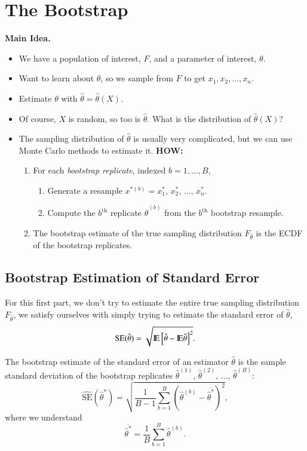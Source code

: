 \documentclass[captions=tableheading]{scrbook}
\begin{document}
\section{The Bootstrap}
\label{sec-4_2}



\textbf{Main Idea.}

\begin{itemize}
\item We have a population of interest, $F$, and a parameter of interest, $\theta$.
\item Want to learn about $\theta$, so we sample from $F$ to get \(x_{1}, x_{2}, ..., x_{n}\).
\item Estimate $\theta$ with $\hat{\theta} = \hat{\theta}(X)$.
\item Of course, $X$ is random, so too is $\hat{\theta}$.  What is the distribution of $\hat{\theta}(X)$?
\item The sampling distribution of $\hat{\theta}$ is usually very complicated, but we can use Monte Carlo methods to estimate it.  \textbf{HOW:}
\begin{enumerate}
\item For each \emph{bootstrap replicate}, indexed \(b = 1, \ldots, B\),
\begin{enumerate}
\item Generate a resample $x^{\ast(b)}= x_{1}^{\ast},\,x_{2}^{\ast},\,\ldots,\,x_{n}^{\ast}$.
\item Compute the $b^{\mathrm{th}}$ replicate $\hat{\theta}^{(b)}$ from the $b^{\mathrm{th}}$ bootstrap resample.
\end{enumerate}
\item The bootstrap estimate of the true sampling distribution $F_{\hat{\theta}}$ is the ECDF of the bootstrap replicates.
\end{enumerate}
\end{itemize}
\subsection{Bootstrap Estimation of Standard Error}
\label{sec-4_2_1}


For this first part, we don't try to estimate the entire true sampling distribution $F_{\hat{\theta}}$, we satisfy ourselves with simply trying to estimate the standard error of $\hat{\theta}$,
\[
\mathrm{SE}(\hat{\theta})=\sqrt{ \mathrm{I\hspace{-1.5pt}E} \left[\hat{\theta} - \mathrm{I\hspace{-1.5pt}E}\hat{\theta}  \right]^{2}}.
\]

The bootstrap estimate of the standard error of an estimator \(\hat{\theta}\) is the sample standard deviation of the bootstrap replicates \(\hat{\theta}^{(1)},\, \hat{\theta}^{(2)},\, \ldots,\,\hat{\theta}^{(B)}\):
\[
\widehat{\mathrm{SE}}(\hat{\theta}^{\ast})=\sqrt{\frac{1}{B-1}\sum_{b=1}^{B} \left( \hat{\theta}^{(b)} - \overline{\hat{\theta}^{\ast}} \right)^{2}},
\]
where we understand
\[
\overline{\hat{\theta}^{\ast}} = \frac{1}{B}\sum_{b=1}^{B} \hat{\theta}^{(b)}.
\]
\end{document}
